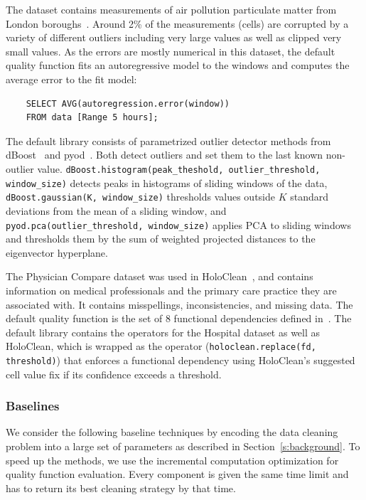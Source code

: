  The dataset contains measurements of air pollution particulate matter from London boroughs~\cite{londonair}. Around 2\% of the measurements (cells) are corrupted by a variety of different outliers including very large values as well as clipped very small values.  As the errors are mostly numerical in this dataset, the default quality function fits an autoregressive model to the windows and computes the average error to the fit model:
\begin{verbatim}
    SELECT AVG(autoregression.error(window))
    FROM data [Range 5 hours];
\end{verbatim}
\noindent The default library consists of parametrized outlier detector methods from dBoost~\cite{mariet2016outlier} and pyod~\cite{pyod}.  Both detect outliers and set them to the last known non-outlier value. \texttt{dBoost.histogram(peak\_theshold, outlier\_threshold, window\_size)} detects peaks in histograms of sliding windows of the data, \texttt{dBoost.gaussian(K, window\_size)} thresholds values outside $K$ standard deviations  from the mean of a sliding window, and \texttt{pyod.pca(outlier\_threshold, window\_size)}  applies PCA to sliding windows and thresholds them by the sum of weighted projected distances to the eigenvector hyperplane.

 The Physician Compare dataset was used in HoloClean~\cite{rekatsinas2017holoclean}, and contains information on medical professionals and the primary care practice they are associated with.  It contains misspellings, inconsistencies, and missing data. The default quality function is the set of 8 functional dependencies defined in~\cite{rekatsinas2017holoclean}.  The default library contains the operators for the Hospital dataset as well as HoloClean, which is wrapped as the operator (\texttt{holoclean.replace(fd, threshold)}) that enforces a functional dependency using HoloClean's suggested cell value fix if its confidence exceeds a threshold.

\subsubsection{Baselines}
We consider the following baseline techniques by encoding the data cleaning problem into a large set of parameters as described in Section~\ref{s:background}. To speed up the methods, we use the incremental computation optimization for quality function evaluation. Every component is given the same time limit and has to return its best cleaning strategy by that time. 

